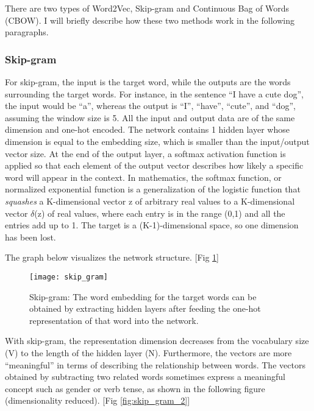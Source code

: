 There are two types of Word2Vec, Skip-gram and Continuous Bag of Words (CBOW). I will briefly describe how these two methods work in the following paragraphs.

\subsubsection{Skip-gram}

For skip-gram, the input is the target word, while the outputs are the words surrounding the target words. For instance, in the sentence “I have a cute dog”, the input would be “a”, whereas the output is “I”, “have”, “cute”, and “dog”, assuming the window size is 5. All the input and output data are of the same dimension and one-hot encoded. The network contains 1 hidden layer whose dimension is equal to the embedding size, which is smaller than the input/output vector size. At the end of the output layer, a
softmax activation function is applied so that each element of the output vector describes how likely a specific word will appear in the context.
In mathematics, the softmax function, or normalized exponential function is a generalization of the logistic function that \textit{squashes} a K-dimensional vector z of arbitrary real values to a K-dimensional vector $\delta$(z) of real values, where each entry is in the range (0,1) and all the entries add up to 1. The target is a (K-1)-dimensional space, so one dimension has been lost. \cite{wiki:softmax}

The graph below visualizes the network structure. [Fig \ref{fig:skip_gram}]

\begin{figure}[ht]
	\centering
	\texttt{[image: skip\_gram]}
	\caption[Skip-gram evaluation]{Skip-gram: The word embedding for the target words can be obtained by extracting hidden layers after feeding the one-hot representation of that word into the network.}
	\label{fig:skip_gram}
\end{figure}

With skip-gram, the representation dimension decreases from the vocabulary size (V) to the length of the hidden layer (N). Furthermore, the vectors are more “meaningful” in terms of describing the relationship between words. The vectors obtained by subtracting two related words sometimes express a meaningful concept such as gender or verb tense, as shown in the following figure (dimensionality reduced). [Fig \ref{fig:skip_gram_2}]

